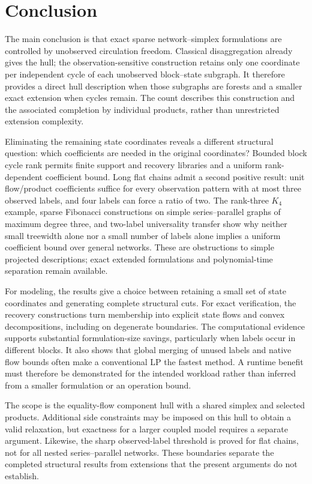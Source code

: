 \section{Conclusion}\label{sec:conclusion}
The main conclusion is that exact sparse network--simplex formulations are
controlled by unobserved circulation freedom. Classical disaggregation
already gives the hull; the observation-sensitive construction retains only
one coordinate per independent cycle of each unobserved block--state
subgraph. It therefore provides a direct hull description when those
subgraphs are forests and a smaller exact extension when cycles remain.
The count describes this construction and the associated completion by
individual products, rather than unrestricted extension complexity.

Eliminating the remaining state coordinates reveals a different structural
question: which coefficients are needed in the original coordinates?
Bounded block cycle rank permits finite support and recovery libraries and
a uniform rank-dependent coefficient bound. Long flat chains admit a second
positive result: unit flow/product coefficients suffice for every observation
pattern with at most three observed labels, and four labels can force a
ratio of two. The rank-three $K_4$ example, sparse Fibonacci constructions
on simple series--parallel graphs of maximum degree three, and two-label
universality transfer show why neither small treewidth alone nor a small
number of labels alone implies a uniform coefficient bound over general
networks. These are obstructions to simple projected descriptions; exact
extended formulations and polynomial-time separation remain available.

For modeling, the results give a choice between retaining a small set of
state coordinates and generating complete structural cuts. For exact
verification, the recovery constructions turn membership into explicit
state flows and convex decompositions, including on degenerate boundaries.
The computational evidence supports substantial formulation-size savings,
particularly when labels occur in different blocks. It also shows that
global merging of unused labels and native flow bounds often make a
conventional LP the fastest method. A runtime benefit must therefore be
demonstrated for the intended workload rather than inferred from a smaller
formulation or an operation bound.

The scope is the equality-flow component hull with a shared simplex and
selected products. Additional side constraints may be imposed on this hull
to obtain a valid relaxation, but exactness for a larger coupled model
requires a separate argument. Likewise, the sharp observed-label threshold
is proved for flat chains, not for all nested series--parallel networks.
These boundaries separate the completed structural results from extensions
that the present arguments do not establish.
